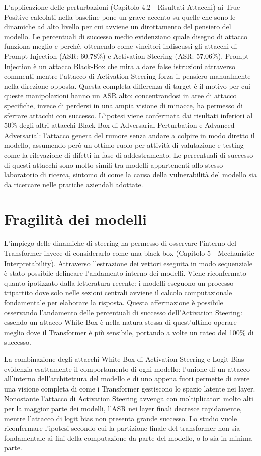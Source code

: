 L'applicazione delle perturbazioni (Capitolo 4.2 - Risultati Attacchi) ai True Positive calcolati nella baseline pone un grave accento su quelle che sono le dinamiche ad alto livello per cui avviene un dirottamento del pensiero del modello.
Le percentuali di successo medio evidenziano quale disegno di attacco funziona meglio e perché, ottenendo come vincitori indiscussi gli attacchi di Prompt Injection (ASR: 60.78\%) e Activation Steering (ASR: 57.06\%).
Prompt Injection è un attacco Black-Box che mira a dare false istruzioni attraverso commenti mentre l'attacco di Activation Steering forza il pensiero manualmente nella direzione opposta. Questa completa differenza di target è il motivo per cui queste manipolazioni hanno un ASR alto: concentrandosi in aree di attacco specifiche, invece di perdersi in una ampia visione di minacce, ha permesso di sferrare attacchi con successo.
L'ipotesi viene confermata dai risultati inferiori al 50\% degli altri attacchi Black-Box di Adversarial Perturbation e Advanced Adversarial: l'attacco genera del rumore senza andare a colpire in modo diretto il modello, assumendo però un ottimo ruolo per attività di valutazione e testing come la rilevazione di difetti in fase di addestramento. Le percentuali di successo di questi attacchi sono molto simili tra modelli appartenenti allo stesso laboratorio di ricerca, sintomo di come la causa della vulnerabilità del modello sia da ricercare nelle pratiche aziendali adottate.

\section{Fragilità dei modelli}
L'impiego delle dinamiche di steering ha permesso di osservare l'interno del Transformer invece di considerarlo come una black-box (Capitolo 5 - Mechanistic Interpretability).
Attraverso l'estrazione dei vettori eseguita in modo sequenziale è stato possibile delineare l'andamento interno dei modelli.
Viene riconfermato quanto ipotizzato dalla letteratura recente: i modelli eseguono un processo tripartito dove solo nelle sezioni centrali avviene il calcolo computazionale fondamentale per elaborare la risposta.
Questa affermazione è possibile osservando l'andamento delle percentuali di successo dell'Activation Steering: essendo un attacco White-Box è nella natura stessa di quest'ultimo operare meglio dove il Transformer è più sensibile, portando a volte un rateo del 100\%  di successo.

La combinazione degli attacchi White-Box di Activation Steering e Logit Bias evidenzia esattamente il comportamento di ogni modello: l'unione di un attacco all'interno dell'architettura del modello e di uno appena fuori permette di avere una visione completa di come i Transformer gestiscono lo spazio latente nei layer.
Nonostante l'attacco di Activation Steering avvenga con moltiplicatori molto alti per la maggior parte dei modelli, l'ASR nei layer finali decresce rapidamente, mentre l'attacco di logit bias non presenta grande successo.
Lo studio vuole riconfermare l'ipotesi secondo cui la partizione finale del transformer non sia fondamentale ai fini della computazione da parte del modello, o lo sia in minima parte. 

